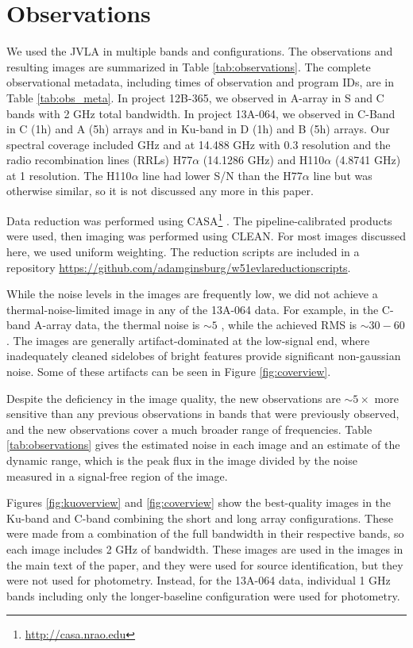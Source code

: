 \section{Observations}
\label{sec:observations}
We used the JVLA in multiple bands and configurations. 
The observations and resulting images are summarized in Table
\ref{tab:observations}.  The complete observational metadata, including times
of observation and program IDs, are in Table \ref{tab:obs_meta}.  In project
12B-365, we observed in A-array in S and C bands with 2 GHz total bandwidth.
In project 13A-064, we observed in C-Band in C (1h) and A (5h) arrays and in
Ku-band in D (1h) and B (5h) arrays.  Our spectral coverage included \ortho
{} GHz and \twotwo at 14.488 GHz with 0.3 \kms resolution and the
radio recombination lines (RRLs) H77$\alpha$ (14.1286 GHz) and H110$\alpha$
(4.8741 GHz) at 1 \kms resolution.  The H110$\alpha$ line had lower S/N than
the H77$\alpha$ line but was otherwise similar, so it is not discussed any more
in this paper.


Data reduction was performed using CASA\footnote{\url{http://casa.nrao.edu}}
\citep{McMullin2007a}.  The pipeline-calibrated products were
used, then imaging was performed using CLEAN.  For most images discussed here, we
used uniform weighting.  The reduction scripts are included in a repository
\url{https://github.com/adamginsburg/w51evlareductionscripts}.



While the noise levels in the images are frequently low, we did not achieve a
thermal-noise-limited image in any of the 13A-064 data.  For example, in the
C-band A-array data, the thermal noise is $\sim5$ \microjy, while the achieved
RMS is $\sim30-60$ \microjy.  The images are generally artifact-dominated
at the low-signal end, where inadequately cleaned sidelobes of bright features
provide significant non-gaussian noise.  Some of these artifacts can be seen
in Figure \ref{fig:coverview}.

Despite the deficiency in the image quality, the new observations are
$\sim5\times$ more sensitive than any previous observations in bands that were
previously observed, and the new observations cover a much broader range of
frequencies.  Table \ref{tab:observations} gives the estimated noise in each 
image and an estimate of the dynamic range, which is the peak flux in the image
divided by the noise measured in a signal-free region of the image.  

Figures \ref{fig:kuoverview} and \ref{fig:coverview} show the best-quality
images in the Ku-band and C-band combining the short and long array
configurations.  These were made from a combination of the full bandwidth in
their respective bands, so each image includes 2 GHz of bandwidth.  These
images are used in the images in the main text of the paper, and they were used
for source identification, but they were not used for photometry.  Instead, for
the 13A-064 data, individual 1 GHz bands including only the longer-baseline
configuration were used for photometry.


